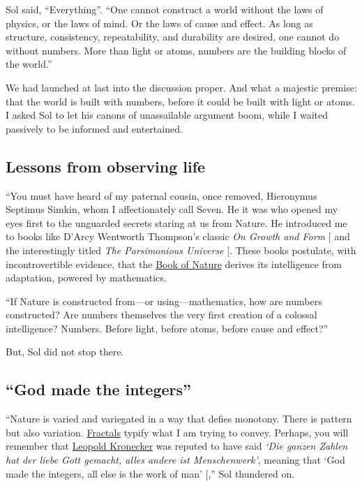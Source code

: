 \documentclass[
  a4paper,
]{article}
\begin{document}
Sol said, ``Everything''. ``One cannot construct a world without the
laws of physics, or the laws of mind. Or the laws of cause and effect.
As long as structure, consistency, repeatability, and durability are
desired, one cannot do without numbers. More than light or atoms,
numbers are the building blocks of the world.''

We had launched at last into the discussion proper. And what a majestic
premise: that the world is built with numbers, before it could be built
with light or atoms. I asked Sol to let his canons of unassailable
argument boom, while I waited passively to be informed and entertained.

\subsection{Lessons from observing
life}\label{lessons-from-observing-life}

``You must have heard of my paternal cousin, once removed, Hieronymus
Septimus Simkin, whom I affectionately call Seven. He it was who opened
my eyes first to the unguarded secrets staring at us from Nature. He
introduced me to books like D'Arcy Wentworth Thompson's classic \emph{On
Growth and Form} {[}\citeproc{ref-thompson-1992}{1}{]} and the
interestingly titled \emph{The Parsimonious Universe}
{[}\citeproc{ref-parsimonious-1996}{2}{]}. These books postulate, with
incontrovertible evidence, that the
\href{https://en.wikipedia.org/wiki/Book_of_Nature}{Book of Nature}
derives its intelligence from adaptation, powered by mathematics.

``If Nature is constructed from---or using---mathematics, how are
numbers constructed? Are numbers themselves the very first creation of a
colossal intelligence? Numbers. Before light, before atoms, before cause
and effect?''

But, Sol did not stop there.

\subsection{``God made the integers''}\label{god-made-the-integers}

``Nature is varied and variegated in a way that defies monotony. There
is pattern but also variation.
\href{https://www.treehugger.com/amazing-fractals-found-in-nature-4868776}{Fractals}
typify what I am trying to convey. Perhaps, you will remember that
\href{https://en.wikipedia.org/wiki/Leopold_Kronecker}{Leopold
Kronecker} was reputed to have said \emph{`Die ganzen Zahlen hat der
liebe Gott gemacht, alles andere ist Menschenwerk'}, meaning that `God
made the integers, all else is the work of man'
{[}\citeproc{ref-kronecker}{3}{]},'' Sol thundered on.
\end{document}
